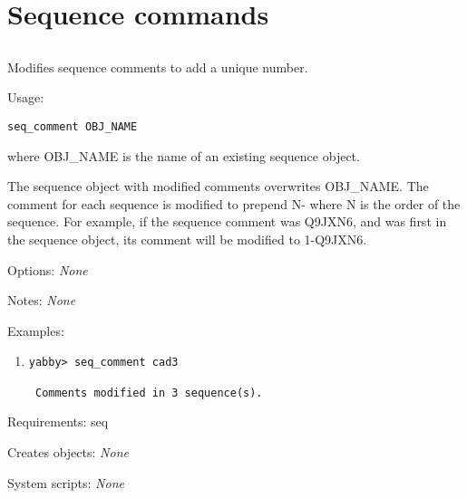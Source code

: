 
\section{Sequence commands}


\subsection[seq\_comment]{  }



Modifies sequence comments to add a unique number.


\begin{description}


\item{Usage:}

{\tt seq\_comment OBJ\_NAME}

where OBJ\_NAME is the name of an existing sequence object.

 The sequence object with modified comments overwrites OBJ\_NAME.
 The comment for each sequence is modified to prepend N- where
 N is the order of the sequence.  For example, if the sequence
 comment was Q9JXN6, and was first in the sequence object, its
 comment will be modified to 1-Q9JXN6.


\item{Options:} {\em None}


\item{Notes:} {\em None}


\item{Examples:}
\begin{enumerate}

\item
\begin{verbatim}
yabby> seq_comment cad3

 Comments modified in 3 sequence(s).
\end{verbatim}

\end{enumerate}


\item{Requirements:} seq


\item{Creates objects:} {\em None}


\item{System scripts:} {\em None}

\end{description}

